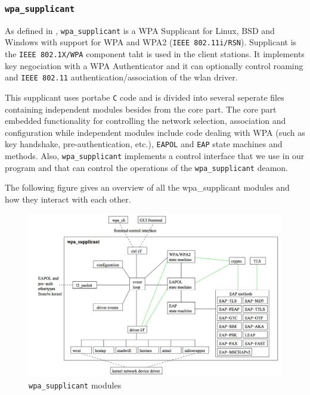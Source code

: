 \subsubsection{\texttt{wpa\_supplicant}} %
 As defined in \cite{wpa-supplicant}, \texttt{wpa\_supplicant} is a WPA Supplicant for Linux, BSD and Windows with support for WPA and WPA2 (\texttt{IEEE 802.11i/RSN}). Supplicant is the \texttt{IEEE 802.1X/WPA} component taht is used in the client stations. It implements key negociation with a WPA Authenticator and it can optionally control roaming and \texttt{IEEE 802.11} authentication/association of the wlan driver.

 This supplicant uses portabe \texttt{C} code and is divided into several seperate files containing independent modules besides from the core part. The core part embedded functionality for controlling the network selection, association and configuration while independent modules include code dealing with WPA (such as key handshake, pre-authentication, etc.), \texttt{EAPOL} and \texttt{EAP} state machines and methods. Also, \texttt{wpa\_supplicant} implements a control interface that we use in our program and that can control the operations of the \texttt{wpa\_supplicant} deamon.

The following figure gives an overview of all the wpa\_supplicant modules and how they interact with each other.

 \begin{figure}[H]
 	\begin{center}
		\includegraphics[width=1\linewidth]{Pictures/chapter4/wpa-supplicant-modules.jpg}
		\caption{\texttt{wpa\_supplicant} modules}
	\end{center}
\end{figure}

